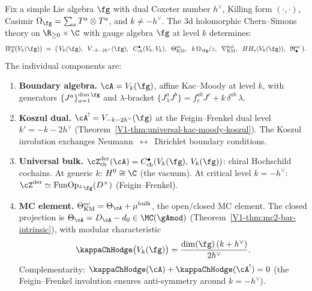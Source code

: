 \begin{computation}
\label{comp:platonic-CS}
Fix a simple Lie algebra $\fg$ with dual Coxeter number $h^\vee$,
Killing form $(\cdot,\cdot)$, Casimir $\Omega_\fg = \sum_a T^a \otimes T^a$,
and $k \ne -h^\vee$. The 3d holomorphic Chern--Simons theory on
$\R_{\ge 0} \times \C$ with gauge algebra $\fg$ at level $k$
determines:
\begin{equation}\label{eq:platonic-CS}
\Pi^{\mathrm{oc}}_X\!\bigl(V_k(\fg)\bigr)
\;=\;
\bigl(\,
V_k(\fg),\;\;
V_{-k-2h^\vee}(\fg),\;\;
C^\bullet_{\mathrm{ch}}(V_k, V_k),\;\;
\Theta^{\mathrm{oc}}_{\mathrm{KM}},\;\;
k\,\Omega_\fg/z,\;\;
\nabla^{\mathrm{hol}}_{\mathrm{KM}},\;\;
HH_*(V_k(\fg)),\;\;
\mathfrak{R}^{\mathrm{oc}}_\bullet
\,\bigr).
\end{equation}
The individual components are:
\begin{enumerate}[label=\textup{(\roman*)},nosep]
\item \textbf{Boundary algebra.}
 $\cA = V_k(\fg)$, affine Kac--Moody at level $k$, with
 generators $\{J^a\}_{a=1}^{\dim \fg}$ and $\lambda$-bracket
 $\{J^a_\lambda J^b\} = f^{ab}_c J^c + k\,\delta^{ab}\,\lambda$.

\item \textbf{Koszul dual.}
 $\cA^! = V_{-k-2h^\vee}(\fg)$
 at the Feigin--Frenkel dual level $k' = -k - 2h^\vee$
 \textup{(}Theorem~\textup{\ref*{V1-thm:universal-kac-moody-koszul}}\textup{)}.
 The Koszul involution exchanges
 Neumann~$\leftrightarrow$~Dirichlet boundary conditions.

\item \textbf{Universal bulk.}
 $\cZ^{\mathrm{der}}_{\mathrm{ch}}(\cA) = C^\bullet_{\mathrm{ch}}(V_k(\fg),\, V_k(\fg))$:
 chiral Hochschild cochains. At generic $k$: $H^0 \cong \C$
 (the vacuum). At critical level $k = -h^\vee$:
 $\cZ^{\mathrm{der}} \simeq
 \operatorname{Fun}\!\operatorname{Op}_{{}^L\fg}(D^\times)$
 (Feigin--Frenkel).

\item \textbf{MC element.}
 $\Theta^{\mathrm{oc}}_{\mathrm{KM}} = \Theta_\cA + \mu^{\mathrm{bulk}}$,
 the open/closed MC element. The closed projection is
 $\Theta_\cA = D_\cA - d_0 \in \MC(\gAmod)$
 \textup{(}Theorem~\textup{\ref*{V1-thm:mc2-bar-intrinsic}}\textup{)},
 with modular characteristic
 \begin{equation}\label{eq:platonic-kappa-KM}
 \kappaChHodge\bigl(V_k(\fg)\bigr) = \frac{\dim(\fg)\,(k + h^\vee)}{2h^\vee}.
 \end{equation}
 Complementarity:
 $\kappaChHodge(\cA) + \kappaChHodge(\cA^!) = 0$
 (the Feigin--Frenkel involution ensures
 anti-symmetry around $k = -h^\vee$).


\end{enumerate}
\end{computation}
